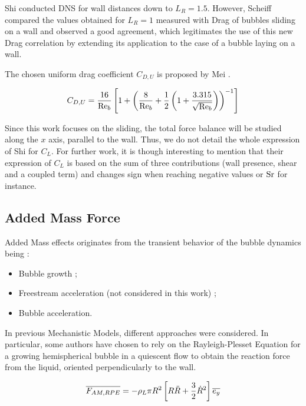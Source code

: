 Shi \etal [Shi] conducted DNS for wall distances down to $L_{R}=1.5$. However, Scheiff \etal[Scheiff] compared the values obtained for $L_{R}=1$ measured with Drag of bubbles sliding on a wall and observed a good agreement, which legitimates the use of this new Drag correlation by extending its application to the case of a bubble laying on a wall.

The chosen uniform drag coefficient $C_{D,U}$ is proposed by Mei \etal [Mei].

\begin{equation}
C_{D,U} = \frac{16}{\mathrm{Re}_{b}}\left[ 1 + \left( \frac{8}{\mathrm{Re}_{b}}+ \frac{1}{2}\left( 1+\frac{3.315}{\sqrt{\mathrm{Re}_{b}}}  \right) \right)^{-1}  \right]
\end{equation}

\npar

Since this work focuses on the sliding, the total force balance will be studied along the $x$ axis, parallel to the wall. Thus, we do not detail the whole expression of Shi \etal for $C_{L}$. For further work, it is though interesting to mention that their expression of $C_{L}$ is based on the sum of three contributions (wall presence, shear and a coupled term) and changes sign when reaching negative values or $\mathrm{Sr}$ for instance.





\subsection{Added Mass Force}
\label{subsec:AM}

Added Mass effects originates from the transient behavior of the bubble dynamics being :

\begin{itemize}
\item Bubble growth ;
\item Freestream acceleration (not considered in this work) ;
\item Bubble acceleration.
\end{itemize}


In previous Mechanistic Models, different approaches were considered. In particular, some authors have chosen to rely on the Rayleigh-Plesset Equation for a growing hemispherical bubble in a quiescent flow to obtain the reaction force from the liquid, oriented perpendicularly to the wall.

\begin{equation}
\overline{F_{AM,RPE}}=- \rho_{L}\pi R^{2}\left[ R\ddot{R}+\frac{3}{2}\dot{R}^{2} \right]\overline{e_{y}}
\end{equation}

